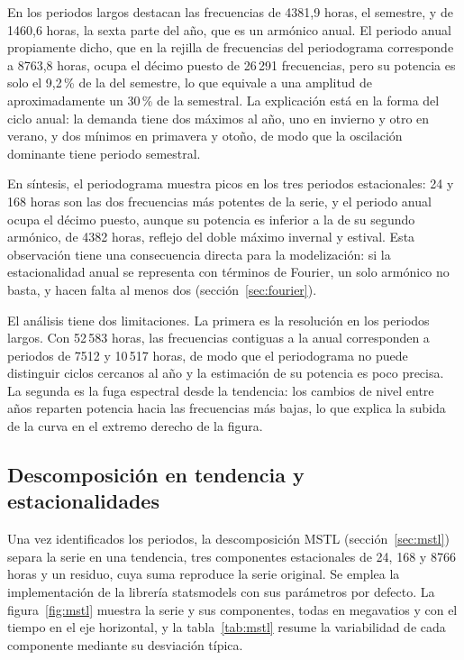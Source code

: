 En los periodos largos destacan las frecuencias de 4381,9 horas, el
semestre, y de 1460,6 horas, la sexta parte del año, que es un armónico
anual. El periodo anual propiamente dicho, que en la rejilla de frecuencias
del periodograma corresponde a 8763,8 horas, ocupa el décimo puesto de 26\,291
frecuencias, pero su potencia es solo el 9,2\,\% de la del semestre, lo que
equivale a una amplitud de aproximadamente un 30\,\% de la semestral. La
explicación está en la forma del ciclo anual: la demanda tiene dos máximos al
año, uno en invierno y otro en verano, y dos mínimos en primavera y otoño, de
modo que la oscilación dominante tiene periodo semestral.

En síntesis, el periodograma muestra picos en los tres periodos
estacionales: 24 y 168 horas son las dos frecuencias más potentes de la
serie, y el periodo anual ocupa el décimo puesto, aunque su potencia es
inferior a la de su segundo armónico, de 4382 horas, reflejo del doble
máximo invernal y estival. Esta observación tiene una consecuencia directa
para la modelización: si la estacionalidad anual se representa con términos
de Fourier, un solo armónico no basta, y hacen falta al menos dos
(sección~\ref{sec:fourier}).

El análisis tiene dos limitaciones. La primera es la resolución en los
periodos largos. Con 52\,583 horas, las frecuencias contiguas a la anual
corresponden a periodos de 7512 y 10\,517 horas, de modo que el periodograma
no puede distinguir ciclos cercanos al año y la estimación de su potencia es
poco precisa. La segunda es la fuga espectral desde la tendencia: los cambios
de nivel entre años reparten potencia hacia las frecuencias más bajas, lo que
explica la subida de la curva en el extremo derecho de la figura.

\subsection{Descomposición en tendencia y estacionalidades}\label{sec:explo-mstl}

Una vez identificados los periodos, la descomposición MSTL
(sección~\ref{sec:mstl}) separa la serie en una tendencia, tres componentes
estacionales de 24, 168 y 8766 horas y un residuo, cuya suma reproduce la
serie original. Se emplea la implementación de la librería statsmodels con
sus parámetros por defecto. La figura~\ref{fig:mstl} muestra la serie y sus
componentes, todas en megavatios y con el tiempo en el eje horizontal, y la
tabla~\ref{tab:mstl} resume la variabilidad de cada componente mediante su
desviación típica.

